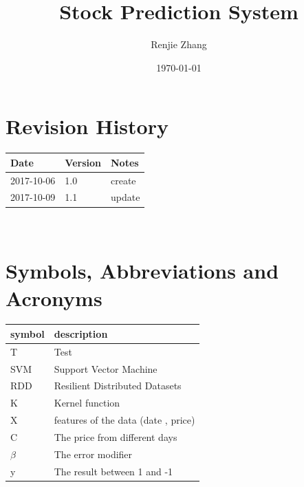 \documentclass[12pt, titlepage]{article}
\begin{document}
\title{Stock Prediction System} 
\author{Renjie Zhang}
\date{\today}
\maketitle


\section{Revision History}

\begin{tabularx}{\textwidth}{p{3cm}p{2cm}X}
\toprule {\bf Date} & {\bf Version} & {\bf Notes}\\
\midrule
2017-10-06 & 1.0 & create\\
2017-10-09 & 1.1 & update\\
\bottomrule
\end{tabularx}

~\newpage

\section{Symbols, Abbreviations and Acronyms}

\renewcommand{\arraystretch}{1.2}
\begin{tabular}{l l} 
\toprule 
\textbf{symbol} & \textbf{description}\\
\midrule 
T & Test\\
SVM & Support Vector Machine\\
RDD &Resilient Distributed Datasets\\
K & Kernel function\\
X & features of the data (date , price)\\
C& The price from different days\\
$\beta$ & The error modifier\\
y& The result between 1 and -1\\ 
\bottomrule
\end{tabular}\\



\newpage

\tableofcontents

\listoftables

\listoffigures

\newpage

\end{document}
